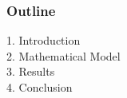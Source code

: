
\maketitle

\begin{frame}
 \frametitle{Outline}
  \vspace{-1cm}
  1. Introduction\\[0.1cm]
  2. Mathematical Model\\[0.1cm]
  3. Results\\[0.1cm]
  4. Conclusion
\end{frame}



